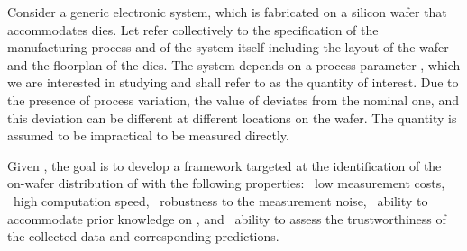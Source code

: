 Consider a generic electronic system, which is fabricated on a silicon wafer
that accommodates \nd dies. Let \spec refer collectively to the specification of
the manufacturing process and of the system itself including the layout of the
wafer and the floorplan of the dies. The system depends on a process parameter
\g, which we are interested in studying and shall refer to as the quantity of
interest. Due to the presence of process variation, the value of \g deviates
from the nominal one, and this deviation can be different at different locations
on the wafer. The quantity is assumed to be impractical to be measured directly.

Given \spec, the goal is to develop a framework targeted at the identification
of the on-wafer distribution of \g with the following properties: \one~low
measurement costs, \two~high computation speed, \three~robustness to the
measurement noise, \four~ability to accommodate prior knowledge on \g, and
\five~ability to assess the trustworthiness of the collected data and
corresponding predictions.
